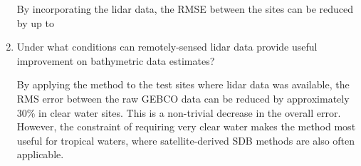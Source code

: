 \begin{enumerate}
    By incorporating the lidar data, the RMSE between the sites can be reduced by up to 
    
    \item Under what conditions can remotely-sensed lidar data provide useful improvement on bathymetric data estimates?
    
    By applying the method to the test sites where lidar data was available, the RMS error between the raw GEBCO data can be reduced by approximately 30\% in clear water sites. This is a non-trivial decrease in the overall error. However, the constraint of requiring very clear water makes the method most useful for tropical waters, where satellite-derived SDB methods are also often applicable. 

\end{enumerate}

